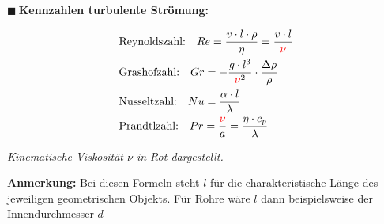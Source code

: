 \documentclass[a4paper,10pt]{article}
\renewcommand{\textbf}[1]{\textsf{{\bfseries {#1}}}}
\renewcommand{\plmtsquare}{{\color{miugray} $\blacksquare~$}}
\begin{document}
\begin{minipage}[t]{.45\textwidth}
\vspace*{4mm}
\plmtsquare \textbf{Kennzahlen turbulente Strömung:} \par \vspace*{-4mm}
\begin{align*}
&\text{Reynoldszahl:} \quad Re = \frac{v \cdot l \cdot \rho}{\eta} = \frac{v \cdot l}{\color{red}{\nu}}
\\
&\text{Grashofzahl:} \quad Gr = - \frac{g \cdot l^3}{{\color{red}{\nu}}^2} \cdot \frac{\Delta \rho}{ \rho} \\
&\text{Nusseltzahl:} \quad Nu = \frac{\alpha \cdot l}{\lambda} \\
&\text{Prandtlzahl:} \quad Pr = \frac{{\color{red}{\nu}}}{a} = \frac{\eta \cdot c_p}{\lambda}
\end{align*}
\par


{\color{red} \textit{Kinematische Viskosität $\nu$ in Rot dargestellt.}}
\par \vspace*{4mm}
\textbf{Anmerkung:} Bei diesen Formeln steht $l$ für die charakteristische Länge des jeweiligen geometrischen Objekts. Für Rohre wäre $l$ dann beispielsweise der Innendurchmesser $d$
\par \vspace*{8mm}


\vfill
\end{minipage}	

%
%
%
\end{document}
